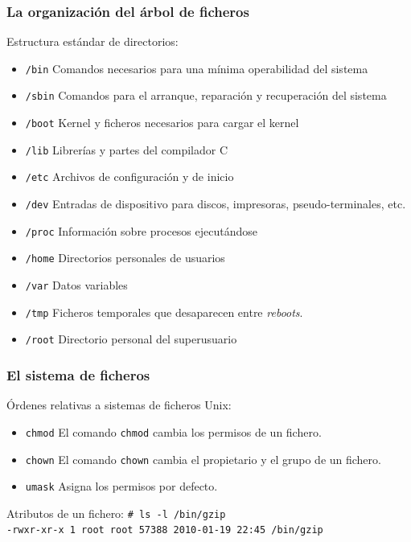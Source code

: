 \documentclass{beamer}
\begin{document}
\begin{frame}
  \frametitle{La organización del árbol de ficheros}

Estructura estándar de directorios:

  \begin{itemize}

\small
    \item \alert{\texttt{/bin}} Comandos necesarios para una mínima operabilidad del sistema 
    \item \alert{\texttt{/sbin}} Comandos para el arranque, reparación y recuperación del sistema
    \item \alert{\texttt{/boot}} Kernel y ficheros necesarios para cargar el kernel 
    \item \alert{\texttt{/lib}} Librerías y partes del compilador C
    \item \alert{\texttt{/etc}} Archivos de configuración y de inicio 
    \item \alert{\texttt{/dev}} Entradas de dispositivo para discos, impresoras, pseudo-terminales, etc.
    \item \alert{\texttt{/proc}} Información sobre procesos ejecutándose
    \item \alert{\texttt{/home}} Directorios personales de usuarios
    \item \alert{\texttt{/var}} Datos variables 
    \item \alert{\texttt{/tmp}} Ficheros temporales que desaparecen entre \textit{reboots}.
    \item \alert{\texttt{/root}} Directorio personal del superusuario 

  \end{itemize}

\normalsize

\end{frame}

\begin{frame}
  \frametitle{El sistema de ficheros}

Órdenes relativas a sistemas de ficheros Unix:

  \begin{itemize}
    \item \alert{\texttt{chmod}} El comando \texttt{chmod} cambia los permisos de un fichero.
    \item \alert{\texttt{chown}} El comando \texttt{chown} cambia el propietario y el grupo de un fichero.
    \item \alert{\texttt{umask}} Asigna los permisos por defecto.
  \end{itemize}



\begin{block}{Atributos de un fichero:}
\small
  \texttt{\# ls -l /bin/gzip} \\ 
  \texttt{-rwxr-xr-x 1 root root 57388 2010-01-19 22:45 /bin/gzip}
\end{block}

\normalsize
\end{frame}
\end{document}
